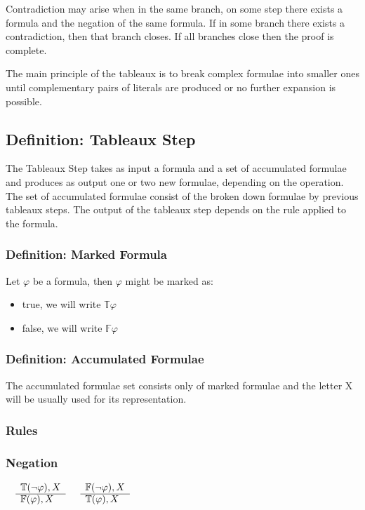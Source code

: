 \documentclass{article}
\begin{document}
	Contradiction may arise when in the same branch, on some step there exists a formula and the negation of the same formula.
	If in some branch there exists a contradiction, then that branch closes. If all branches close then the proof is complete.
	
	The main principle of the tableaux is to break complex formulae into smaller ones until complementary pairs of literals are
	produced or no further expansion is possible.

	\subsection{Definition: Tableaux Step}
		The Tableaux Step takes as input a formula and a set of accumulated formulae and produces as 
		output one or two new formulae, depending on the operation. 
		The set of accumulated formulae consist of the broken down formulae by previous tableaux steps.
		The output of the tableaux step depends on the rule applied to the formula.

		\subsubsection*{Definition: Marked Formula} 
			Let $\varphi$ be a formula, then $\varphi$ might be marked as:
			\begin{itemize}
				\item true, we will write $\mathbb{T}\varphi$
				\item false, we will write $\mathbb{F}\varphi$
			\end{itemize}

		\subsubsection*{Definition: Accumulated Formulae}
			The accumulated formulae set consists only of marked formulae and the letter X will be usually used for its representation.

		\subsubsection{Rules}
		\subsubsection*{Negation}
			$\begin{array}{rl}
				& \mathbb{T}(\neg \varphi), X \\
			      \cline{2-2}
			      & \mathbb{F}(\varphi), X
			\end{array}$
			\:\:\:\:\:\:\:\:\:\:\:\:\:\:\:\:\:\:\:\:\:\:\:\:\:\:\:\:\:\:\:\:\:\:\:\:\:\:\:\:\:\:\:\:\:\:\:\:
			$\begin{array}{rl}
				& \mathbb{F}(\neg \varphi), X \\
			      \cline{2-2}
			      & \mathbb{T}(\varphi), X
			\end{array}$
\end{document}

